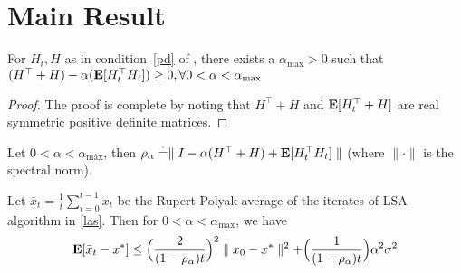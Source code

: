 \section{Main Result}
\begin{lemma}
For $H_t, H$ as in condition~\ref{pd} of , there exists a $\alpha_{\max}>0$ such that $(H^\top+H)-\alpha (\mathbf{E}[H_t^\top H_t])\geq 0, \forall 0< \alpha<\alpha_{\max}$ 
\end{lemma}
\begin{proof}
The proof is complete by noting that $H^\top+H$ and $\mathbf{E}[H^\top_t+H]$ are real symmetric positive definite matrices.
\end{proof}
Let $0<\alpha<\alpha_{\max}$, then $\rho_{\alpha}\stackrel{\cdot}{=}\parallel I-\alpha(H^\top+H)+\mathbf{E}[H^\top_t H_t]\parallel$ (where $\parallel\cdot\parallel$ is the spectral norm).
\begin{theorem}
Let $\bar{x}_t=\frac{1}{t}\sum_{i=0}^{t-1} x_t$ be the Rupert-Polyak average of the iterates of LSA algorithm in \eqref{las}. Then for $0<\alpha< \alpha_{\max}$, we have
\begin{align}
\mathbf{E}[\bar{x}_t-x^*]\leq \Big(\frac{2}{(1-\rho_{\alpha})t}\Big)^2\parallel x_0-x^*\parallel^2+ \Big(\frac{1}{(1-\rho_{\alpha})t}\Big)\alpha^2\sigma^2
\end{align}
\end{theorem}
